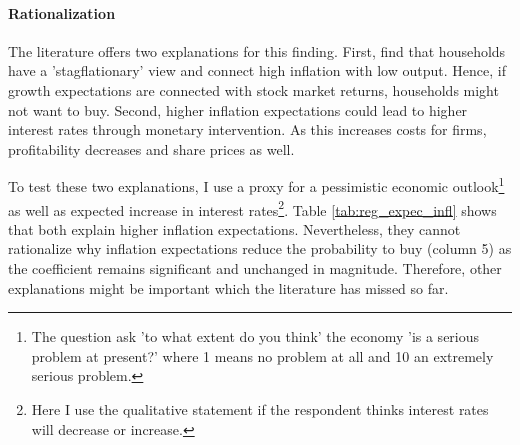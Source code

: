 \documentclass[ProjectABM]{subfiles}
\begin{document}








\paragraph{Rationalization}
The literature offers two explanations for this finding. First, \cite{CCG_2020_inflation_communication} find that households have a 'stagflationary' view and connect high inflation with low output. Hence, if growth expectations are connected with stock market returns, households might not want to buy. Second, higher inflation expectations could lead to higher interest rates through monetary intervention. As this increases costs for firms, profitability decreases and share prices as well. 

To test these two explanations, I use a proxy for a pessimistic economic outlook\footnote{The question ask 'to what extent do you think' the economy 'is a serious problem at present?' where 1 means no problem at all and 10 an extremely serious problem.} as well as expected increase in interest rates\footnote{Here I use the qualitative statement if the respondent thinks interest rates will decrease or increase.}. Table \ref{tab:reg_expec_infl} shows that both explain higher inflation expectations. Nevertheless, they cannot rationalize why inflation expectations reduce the probability to buy (column 5) as the coefficient remains significant and unchanged in magnitude. Therefore, other explanations might be important which the literature has missed so far.

\end{document}
